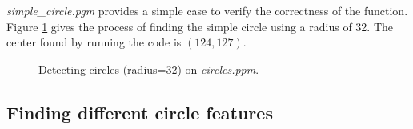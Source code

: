 \documentclass[paper=a4, fontsize=11pt]{scrartcl}
\begin{document}
\emph{simple\_circle.pgm} provides a simple case to verify the correctness of the function. 
Figure \ref{fig:hough:simple_circle} gives the process of finding the simple circle using a radius of 32.
The center found by running the code is $ (124, 127) $.

\begin{figure}[h]
\centering
{}
\caption{Detecting circles (radius=32) on \emph{circles.ppm}.}
\label{fig:hough:simple_circle}
\end{figure}

\subsection{Finding different circle features}
\end{document}

